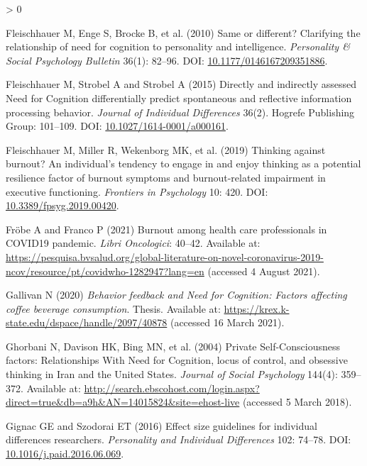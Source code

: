 \documentclass[
  english,
  man,floatsintext]{apa6}
\newlength{\cslhangindent}
\newenvironment{CSLReferences}[2] %
 {%
  \setlength{\parindent}{0pt}
  \ifodd #1 \everypar{\setlength{\hangindent}{\cslhangindent}}\ignorespaces\fi
  \ifnum #2 > 0
  \setlength{\parskip}{#2\baselineskip}
  \fi
 }%
 {}
\begin{document}
\begin{CSLReferences}{1}{0}
\leavevmode\hypertarget{ref-Fleischhauer2010}{}%
Fleischhauer M, Enge S, Brocke B, et al. (2010) Same or different? {Clarifying} the relationship of need for cognition to personality and intelligence. \emph{Personality \& Social Psychology Bulletin} 36(1): 82--96. DOI: \href{https://doi.org/10.1177/0146167209351886}{10.1177/0146167209351886}.

\leavevmode\hypertarget{ref-Fleischhauer2015}{}%
Fleischhauer M, Strobel A and Strobel A (2015) Directly and indirectly assessed {Need for Cognition} differentially predict spontaneous and reflective information processing behavior. \emph{Journal of Individual Differences} 36(2). Hogrefe Publishing Group: 101--109. DOI: \href{https://doi.org/10.1027/1614-0001/a000161}{10.1027/1614-0001/a000161}.

\leavevmode\hypertarget{ref-Fleischhauer2019}{}%
Fleischhauer M, Miller R, Wekenborg MK, et al. (2019) Thinking against burnout? {An} individual's tendency to engage in and enjoy thinking as a potential resilience factor of burnout symptoms and burnout-related impairment in executive functioning. \emph{Frontiers in Psychology} 10: 420. DOI: \href{https://doi.org/10.3389/fpsyg.2019.00420}{10.3389/fpsyg.2019.00420}.

\leavevmode\hypertarget{ref-Froebe2021}{}%
Fröbe A and Franco P (2021) Burnout among health care professionals in {COVID19} pandemic. \emph{Libri Oncologici}: 40--42. Available at: \url{https://pesquisa.bvsalud.org/global-literature-on-novel-coronavirus-2019-ncov/resource/pt/covidwho-1282947?lang=en} (accessed 4 August 2021).

\leavevmode\hypertarget{ref-Gallivan2020}{}%
Gallivan N (2020) \emph{Behavior feedback and {Need} for {Cognition}: {Factors} affecting coffee beverage consumption}. Thesis. Available at: \url{https://krex.k-state.edu/dspace/handle/2097/40878} (accessed 16 March 2021).

\leavevmode\hypertarget{ref-Ghorbani2004}{}%
Ghorbani N, Davison HK, Bing MN, et al. (2004) Private {Self}-{Consciousness} factors: {Relationships} {With} {Need} for {Cognition}, locus of control, and obsessive thinking in {Iran} and the {United} {States}. \emph{Journal of Social Psychology} 144(4): 359--372. Available at: \url{http://search.ebscohost.com/login.aspx?direct=true\&db=a9h\&AN=14015824\&site=ehost-live} (accessed 5 March 2018).

\leavevmode\hypertarget{ref-Gignac2016}{}%
Gignac GE and Szodorai ET (2016) Effect size guidelines for individual differences researchers. \emph{Personality and Individual Differences} 102: 74--78. DOI: \href{https://doi.org/10.1016/j.paid.2016.06.069}{10.1016/j.paid.2016.06.069}.


\end{CSLReferences}
\end{document}
